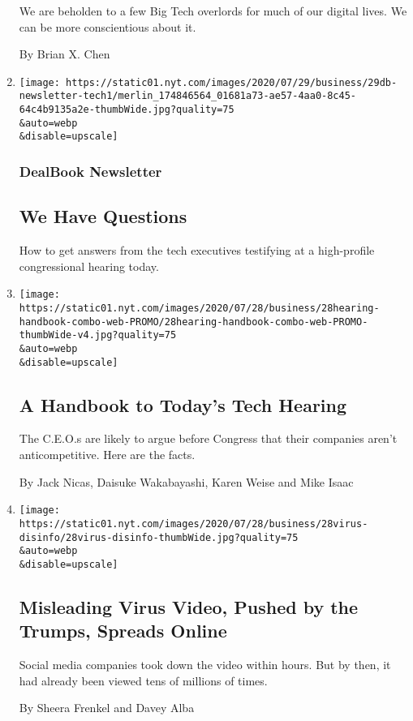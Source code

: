 \begin{enumerate}
  We are beholden to a few Big Tech overlords for much of our digital
  lives. We can be more conscientious about it.

  By Brian X. Chen
\item
  \href{/2020/07/29/business/dealbook/tech-congress-hearing-questions.html}{}

  \texttt{[image: https://static01.nyt.com/images/2020/07/29/business/29db-newsletter-tech1/merlin\_174846564\_01681a73-ae57-4aa0-8c45-64c4b9135a2e-thumbWide.jpg?quality=75\\\&auto=webp\\\&disable=upscale]}

  \hypertarget{dealbook-newsletter-2}{%
  \subsubsection{DealBook Newsletter}\label{dealbook-newsletter-2}}

  \hypertarget{we-have-questions}{%
  \subsection{We Have Questions}\label{we-have-questions}}

  How to get answers from the tech executives testifying at a
  high-profile congressional hearing today.
\item
  \href{/2020/07/29/technology/tech-ceos-congress-what-to-know.html}{}

  \texttt{[image: https://static01.nyt.com/images/2020/07/28/business/28hearing-handbook-combo-web-PROMO/28hearing-handbook-combo-web-PROMO-thumbWide-v4.jpg?quality=75\\\&auto=webp\\\&disable=upscale]}

  \hypertarget{a-handbook-to-todays-tech-hearing}{%
  \subsection{A Handbook to Today's Tech
  Hearing}\label{a-handbook-to-todays-tech-hearing}}

  The C.E.O.s are likely to argue before Congress that their companies
  aren't anticompetitive. Here are the facts.

  By Jack Nicas, Daisuke Wakabayashi, Karen Weise and Mike Isaac
\item
  \href{/2020/07/28/technology/virus-video-trump.html}{}

  \texttt{[image: https://static01.nyt.com/images/2020/07/28/business/28virus-disinfo/28virus-disinfo-thumbWide.jpg?quality=75\\\&auto=webp\\\&disable=upscale]}

  \hypertarget{misleading-virus-video-pushed-by-the-trumps-spreads-online}{%
  \subsection{Misleading Virus Video, Pushed by the Trumps, Spreads
  Online}\label{misleading-virus-video-pushed-by-the-trumps-spreads-online}}

  Social media companies took down the video within hours. But by then,
  it had already been viewed tens of millions of times.

  By Sheera Frenkel and Davey Alba
\end{enumerate}

